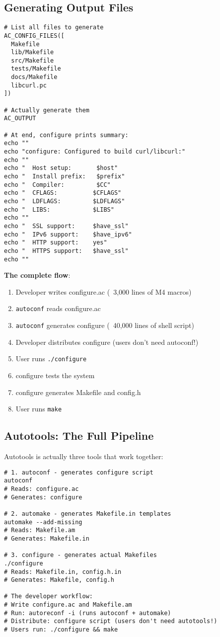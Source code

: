 \subsection{Generating Output Files}

\begin{lstlisting}
# List all files to generate
AC_CONFIG_FILES([
  Makefile
  lib/Makefile
  src/Makefile
  tests/Makefile
  docs/Makefile
  libcurl.pc
])

# Actually generate them
AC_OUTPUT

# At end, configure prints summary:
echo ""
echo "configure: Configured to build curl/libcurl:"
echo ""
echo "  Host setup:       $host"
echo "  Install prefix:   $prefix"
echo "  Compiler:         $CC"
echo "  CFLAGS:          $CFLAGS"
echo "  LDFLAGS:         $LDFLAGS"
echo "  LIBS:            $LIBS"
echo ""
echo "  SSL support:     $have_ssl"
echo "  IPv6 support:    $have_ipv6"
echo "  HTTP support:    yes"
echo "  HTTPS support:   $have_ssl"
echo ""
\end{lstlisting}

\textbf{The complete flow}:

\begin{enumerate}
    \item Developer writes configure.ac (~3,000 lines of M4 macros)
    \item \texttt{autoconf} reads configure.ac
    \item \texttt{autoconf} generates configure (~40,000 lines of shell script)
    \item Developer distributes configure (users don't need autoconf!)
    \item User runs \texttt{./configure}
    \item configure tests the system
    \item configure generates Makefile and config.h
    \item User runs \texttt{make}
\end{enumerate}

\subsection{Autotools: The Full Pipeline}

Autotools is actually three tools that work together:

\begin{lstlisting}
# 1. autoconf - generates configure script
autoconf
# Reads: configure.ac
# Generates: configure

# 2. automake - generates Makefile.in templates
automake --add-missing
# Reads: Makefile.am
# Generates: Makefile.in

# 3. configure - generates actual Makefiles
./configure
# Reads: Makefile.in, config.h.in
# Generates: Makefile, config.h

# The developer workflow:
# Write configure.ac and Makefile.am
# Run: autoreconf -i (runs autoconf + automake)
# Distribute: configure script (users don't need autotools!)
# Users run: ./configure && make
\end{lstlisting}

